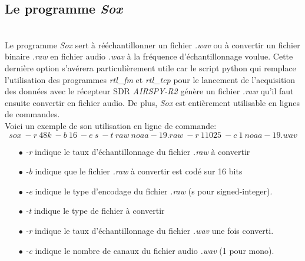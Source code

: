 \documentclass[12pt,fleqn]{book} %
\begin{document}
\subsection{Le programme \emph{Sox}}
~\\\indent Le programme \emph{Sox} sert à rééchantillonner un fichier \emph{.wav} ou à convertir un fichier binaire \emph{.raw} en fichier audio \emph{.wav} à la fréquence d'échantillonnage voulue. Cette dernière option s'avérera particulièrement utile car le script python qui remplace l'utilisation des programmes \emph{rtl\_fm} et \emph{rtl\_tcp} pour le lancement de l'acquisition des données avec le récepteur SDR \emph{AIRSPY-R2} génère un fichier \emph{.raw} qu'il faut ensuite convertir en fichier audio. De plus, \emph{Sox} est entièrement utilisable en lignes de commandes.
~\\ Voici un exemple de son utilisation en ligne de commande:
$$ sox\ -r\ 48k\ -b\ 16\ -e\ s\ -t\ raw\ noaa-19.raw\ -r\ 11025\ -c\ 1\ noaa-19.wav $$
\begin{itemize}
 \item[$\bullet$] \emph{-r} indique le taux d'échantillonnage du fichier \emph{.raw} à convertir
 \item[$\bullet$] \emph{-b} indique que le fichier \emph{.raw} à convertir est codé sur 16 bits
 \item[$\bullet$] \emph{-e} indique le type d'encodage du fichier \emph{.raw} (s pour signed-integer).
 \item[$\bullet$] \emph{-t} indique le type de fichier à convertir
 \item[$\bullet$] \emph{-r} indique le taux d'échantillonnage du fichier \emph{.wav} une fois converti.
 \item[$\bullet$] \emph{-c} indique le nombre de canaux du fichier audio \emph{.wav} (1 pour mono).
\end{itemize}
\end{document}
